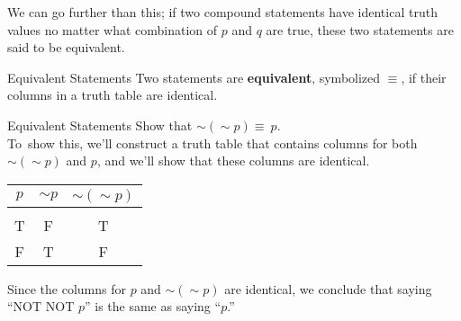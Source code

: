 We can go further than this; if two compound statements have identical truth values no matter what combination of $p$ and $q$ are true, these two statements are said to be equivalent.

\begin{proc}{Equivalent Statements}
Two statements are \textbf{equivalent}, symbolized $\equiv$, if their columns in a truth table are identical.
\end{proc}

\begin{example}[https://www.youtube.com/watch?v=B5GmnkcuKHc]{Equivalent Statements}
Show that $\sim (\sim p) \equiv\ p$.\\

To\sol\ show this, we'll construct a truth table that contains columns for both $\sim(\sim p)$ and $p$, and we'll show that these columns are identical.
\begin{center}
\begin{tabular}{|c c c|}
\hline
$p$ & $\sim p$ & $\sim (\sim p)$\\
\hline
& &\\
T & F & T\\
F & T & F\\
\hline
\end{tabular}
\end{center}

Since the columns for $p$ and $\sim (\sim p)$ are identical, we conclude that saying ``NOT NOT $p$'' is the same as saying ``$p$.''
\end{example}

